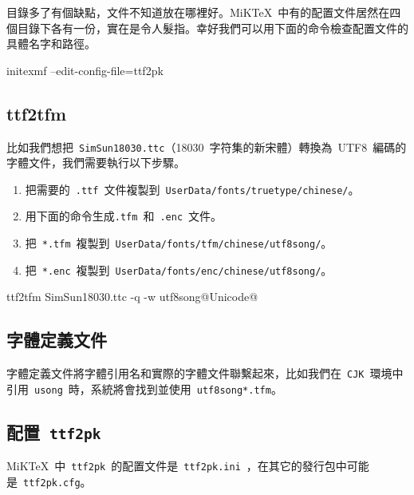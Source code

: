 目錄多了有個缺點，文件不知道放在哪裡好。MiKTeX~中有的配置文件居然在四個目錄下各有一份，實在是令人髮指。幸好我們可以用下面的命令檢查配置文件的具體名字和路徑。

\begin{code}
initexmf --edit-config-file=ttf2pk
\end{code}

\subsection{ttf2tfm}
比如我們想把~\verb|SimSun18030.ttc|（18030~字符集的新宋體）轉換為~UTF8~編碼的字體文件，我們需要執行以下步驟。

\begin{enumerate}
    \item 把需要的~\verb|.ttf|~文件複製到~\verb|UserData/fonts/truetype/chinese/|。
    \item 用下面的命令生成\verb|.tfm|~和~\verb|.enc|~文件。
    \item 把~\verb|*.tfm|~複製到~\verb|UserData/fonts/tfm/chinese/utf8song/|。
    \item 把~\verb|*.enc|~複製到~\verb|UserData/fonts/enc/chinese/utf8song/|。
\end{enumerate}

\begin{code}
ttf2tfm SimSun18030.ttc -q -w utf8song@Unicode@
\end{code}

\subsection{字體定義文件}
字體定義文件將字體引用名和實際的字體文件聯繫起來，比如我們在~\verb|CJK|~環境中引用~\verb|usong|~時，系統將會找到並使用~\verb|utf8song*.tfm|。


\subsection{配置~\texttt{ttf2pk}}
MiKTeX~中~\verb|ttf2pk|~的配置文件是~\verb|ttf2pk.ini|~，在其它的發行包中可能是~\verb|ttf2pk.cfg|。

